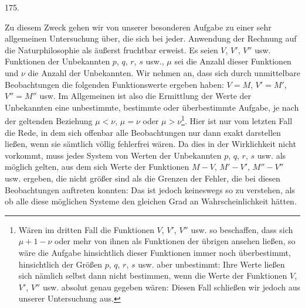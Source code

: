 \par{}\medskip
\begin{center}\hypertarget{native-246-article175}{}175.\end{center}
Zu diesem Zweck gehen wir von unserer besonderen Aufgabe zu einer sehr allgemeinen Untersuchung über, die sich bei jeder. Anwendung der Rechnung auf die Naturphilosophie als äußerst fruchtbar erweist. Es seien $V$, $V'$, $V''$ usw. Funktionen der Unbekannten $p$, $q$, $r$, $s$ usw., $\mu$ sei die Anzahl dieser Funktionen und $\nu$ die Anzahl der Unbekannten. Wir nehmen an, dass sich durch unmittelbare Beobachtungen die folgenden Funktionswerte ergeben haben: $V=M$, $V'=M'$, $V''=M''$ usw. Im Allgemeinen ist also die Ermittlung der Werte der Unbekannten eine unbestimmte, bestimmte oder überbestimmte Aufgabe, je nach der geltenden Beziehung $\mu<\nu$, $\mu=\nu$ oder $\mu>\nu$\footnote{Wären im dritten Fall die Funktionen $V$, $V'$, $V''$ usw. so beschaffen, dass sich $\mu+1-\nu$ oder mehr von ihnen als Funktionen der übrigen ansehen ließen, so wäre die Aufgabe hinsichtlich dieser Funktionen immer noch überbestimmt, hinsichtlich der Größen $p$, $q$, $r$, $s$ usw. aber unbestimmt: Ihre Werte ließen sich nämlich selbst dann nicht bestimmen, wenn die Werte der Funktionen $V$, $V'$, $V''$ usw. absolut genau gegeben wären: Diesen Fall schließen wir jedoch aus unserer Untersuchung aus.}.
Hier ist nur vom letzten Fall die Rede, in dem sich offenbar alle Beobachtungen nur dann exakt darstellen ließen, wenn sie sämtlich völlig fehlerfrei wären. Da dies in der Wirklichkeit nicht vorkommt, muss jedes System von Werten der Unbekannten $p$, $q$, $r$, $s$ usw. als möglich gelten, aus dem sich Werte der Funktionen $M-V$, $M'-V'$, $M''-V''$ usw. ergeben, die nicht größer sind als die Grenzen der Fehler, die bei diesen Beobachtungen auftreten konnten: Das ist jedoch keineswegs so zu verstehen, als ob alle diese möglichen Systeme den gleichen Grad an Wahrscheinlichkeit hätten.

